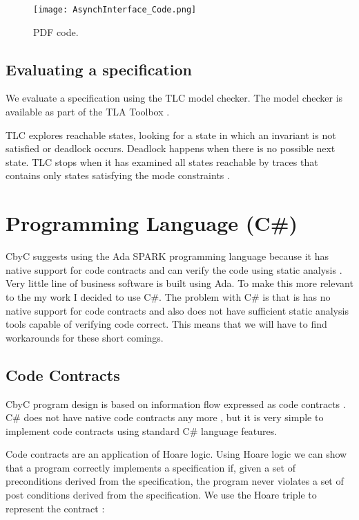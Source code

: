 \begin{figure}[H]
	\centering
	\texttt{[image: AsynchInterface\_Code.png]}
	\decoRule
	\caption{PDF code.}
	\label{fig:PDFCode}
\end{figure}

\subsection{Evaluating a specification}
We evaluate a specification using the TLC model checker. The model checker is available as part of the 
TLA Toolbox \parencite{The_TLA_Toolbox}.

TLC explores reachable states, looking for a state in which an invariant is not satisfied or
deadlock occurs. Deadlock happens when there is no possible next state. TLC stops 
when it has examined all states reachable by traces that contains only states
satisfying the mode constraints \parencite{ModelCheckingTLASpecifications}.

\section{Programming Language (C\#)}

CbyC suggests using the Ada SPARK programming language because it has native
support for code contracts and can verify the code using static analysis \parencite{CbyCPraxis}.
Very little line of business software is built using Ada. To make this more relevant 
to the my work I decided to use C\#. The problem with C\# is that is has no native
support for code contracts and also does not have sufficient static analysis tools 
capable of verifying code correct. This means that we will have to find workarounds
for these short comings. 

\subsection{Code Contracts}

CbyC program design is based on information flow expressed as code contracts 
\parencite{CbyCMan}. C\# does not have native code contracts any more \parencite{NoCodeContracts},
but it is very simple to implement code contracts using standard C\# language features.

Code contracts are an application of Hoare logic. Using Hoare logic
we can show that a program correctly implements a specification if, given a set of 
preconditions derived from the specification, the program never violates a set of
post conditions derived from the specification. We use the Hoare triple to 
represent the contract \parencite{BasisForProgramming}:

